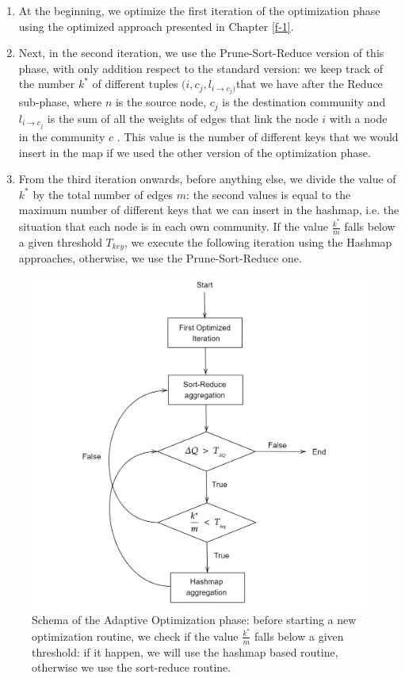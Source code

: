 \begin{enumerate}
	\item At the beginning, we optimize the first iteration of the optimization phase using the optimized approach presented in Chapter \ref{f-1}.
	\item Next, in the second iteration, we use the Prune-Sort-Reduce version of this phase, with only addition respect to the standard version: we keep track of the number $k^*$ of different tuples $(i,c_j,l_{i\rightarrow c_j)}$that we have after the Reduce sub-phase,  where $n$ is the source node, $c_j$ is the destination community and $l_{i\rightarrow c_j}$ is the sum of all the weights of edges that link the node $i$ with a node in the community $c$ . This value is the number of different keys that we would insert in the map if we used the other version of the optimization phase.
	\item From the third iteration onwards, before anything else, we divide the value of $k^*$ by the total number of edges $m$: the second values is equal to the maximum number of different keys that we can insert in the hashmap, i.e. the situation that each node is in each own community. If the value $\frac{k^*}{m}$ falls below a given threshold $T_{key}$, we execute the following iteration using the Hashmap approaches, otherwise, we use the Prune-Sort-Reduce one. 
\end{enumerate}
\begin{figure}[t!]
	\centering
	\includegraphics[width=0.7\linewidth]{0-resources/adaptive_schema}
	\caption{Schema of the Adaptive Optimization phase: before starting a new optimization routine, we check if the value $\frac{k^*}{m}$ falls below a given threshold: if it happen, we will use the hashmap based routine, otherwise we use the sort-reduce routine.}
	\label{fig:adaptiveschema}
\end{figure}
